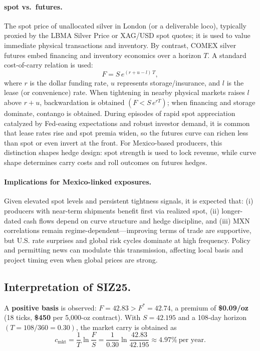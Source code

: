 \documentclass[10pt,a4paper]{article} %
\begin{document}
\paragraph{spot vs.\ futures.}
The spot price of unallocated silver in London (or a deliverable loco), typically proxied by the LBMA Silver Price or XAG/USD spot quotes; it is used to value immediate physical transactions and inventory. By contrast, COMEX silver futures embed financing and inventory economics over a horizon \(T\). A standard cost-of-carry relation is used:
\[
F = S\,e^{(r+u-l)\,T},
\]
where \(r\) is the dollar funding rate, \(u\) represents storage/insurance, and \(l\) is the lease (or convenience) rate. When tightening in nearby physical markets raises \(l\) above \(r+u\), backwardation is obtained \((F<S\,e^{rT})\); when financing and storage dominate, contango is obtained. During episodes of rapid spot appreciation catalyzed by Fed-easing expectations and robust investor demand, it is common that lease rates rise and spot premia widen, so the futures curve can richen less than spot or even invert at the front. For Mexico-based producers, this distinction shapes hedge design: spot strength is used to lock revenue, while curve shape determines carry costs and roll outcomes on futures hedges.

\paragraph{Implications for Mexico-linked exposures.}
Given elevated spot levels and persistent tightness signals, it is expected that: (i) producers with near-term shipments benefit first via realized spot, (ii) longer-dated cash flows depend on curve structure and hedge discipline, and (iii) MXN correlations remain regime-dependent—improving terms of trade are supportive, but U.S. rate surprises and global risk cycles dominate at high frequency. Policy and permitting news can modulate this transmission, affecting local basis and project timing even when global prices are strong.


\subsection{Interpretation of SIZ25.}
A \textbf{positive basis} is observed: $F=42.83>F^{*}=42.74$, a premium of \textbf{\$0.09/oz} (18 ticks, \textbf{\$450} per 5,000-oz contract). With $S=42.195$ and a 108-day horizon $(T=108/360=0.30)$, the market carry is obtained as
\[
c_{\mathrm{mkt}} = \frac{1}{T}\ln\!\frac{F}{S}
= \frac{1}{0.30}\ln\!\frac{42.83}{42.195}
\approx \mathbf{4.97\%}\ \text{per year}.
\]
\end{document}
